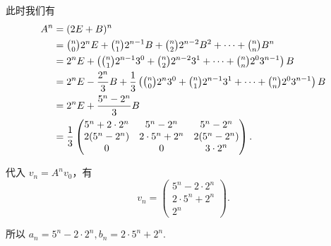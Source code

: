 \begin{exercise}
\begin{exgroup}
\begin{answer}
            此时我们有
            \begin{align*}
                A^n &= (2E + B)^n \\
                    &= \tbinom{n}{0} 2^n E + \tbinom{n}{1} 2^{n-1} B + \tbinom{n}{2} 2^{n-2} B^2 + \cdots + \tbinom{n}{n} B^n \\
                    &= 2^n E + \left(\tbinom{n}{1} 2^{n-1} 3^0 + \tbinom{n}{2} 2^{n-2} 3^1 + \cdots + \tbinom{n}{n} 2^0 3^{n-1} \right) B \\
                    &= 2^n E - \frac{2^n}{3} B + \frac{1}{3} \left(\tbinom{n}{0} 2^n 3^0 + \tbinom{n}{1} 2^{n-1} 3^1 + \cdots + \tbinom{n}{n} 2^0 3^{n-1} \right) B \\
                    &= 2^n E + \frac{5^n - 2^n}{3} B \\
                    &= \frac{1}{3} \begin{pmatrix}
                        5^n + 2 \cdot 2^n & 5^n - 2^n         & 5^n - 2^n    \\
                        2(5^n - 2^n)      & 2 \cdot 5^n + 2^n & 2(5^n - 2^n) \\
                        0                 & 0                 & 3 \cdot 2^n
                    \end{pmatrix}.
            \end{align*}

            代入 $v_n = A^n v_0$，有
            \[
                v_n = \begin{pmatrix}
                    5^n - 2 \cdot 2^n \\
                    2 \cdot 5^n + 2^n \\
                    2^n
                \end{pmatrix}.
            \]

            所以 $a_n = 5^n - 2 \cdot 2^n, b_n = 2 \cdot 5^n + 2^n$.

        \end{answer}


\end{exgroup}
\end{exercise}
